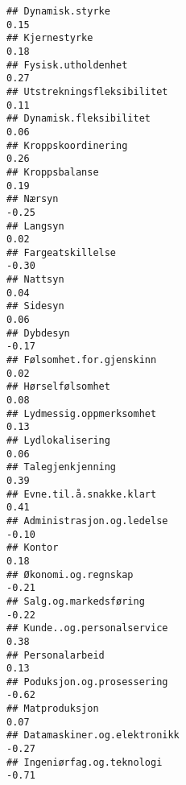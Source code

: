\documentclass[
]{article}
\begin{document}
\begin{verbatim}
## Dynamisk.styrke                                                                   0.15
## Kjernestyrke                                                                      0.18
## Fysisk.utholdenhet                                                                0.27
## Utstrekningsfleksibilitet                                                         0.11
## Dynamisk.fleksibilitet                                                            0.06
## Kroppskoordinering                                                                0.26
## Kroppsbalanse                                                                     0.19
## Nærsyn                                                                           -0.25
## Langsyn                                                                           0.02
## Fargeatskillelse                                                                 -0.30
## Nattsyn                                                                           0.04
## Sidesyn                                                                           0.06
## Dybdesyn                                                                         -0.17
## Følsomhet.for.gjenskinn                                                           0.02
## Hørselfølsomhet                                                                   0.08
## Lydmessig.oppmerksomhet                                                           0.13
## Lydlokalisering                                                                   0.06
## Talegjenkjenning                                                                  0.39
## Evne.til.å.snakke.klart                                                           0.41
## Administrasjon.og.ledelse                                                        -0.10
## Kontor                                                                            0.18
## Økonomi.og.regnskap                                                              -0.21
## Salg.og.markedsføring                                                            -0.22
## Kunde..og.personalservice                                                         0.38
## Personalarbeid                                                                    0.13
## Poduksjon.og.prosessering                                                        -0.62
## Matproduksjon                                                                     0.07
## Datamaskiner.og.elektronikk                                                      -0.27
## Ingeniørfag.og.teknologi                                                         -0.71

\end{verbatim}
\end{document}
